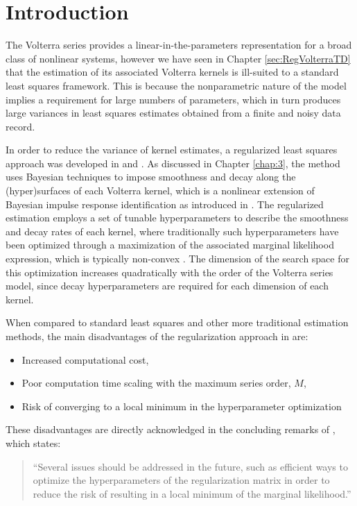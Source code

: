 \section{Introduction}

The Volterra series provides a linear-in-the-parameters representation for a broad class of nonlinear systems, however we have seen in Chapter \ref{sec:RegVolterraTD} that the estimation of its associated Volterra kernels is ill-suited to a standard least squares framework. This is because the nonparametric nature of the model implies a requirement for large numbers of parameters, which in turn produces large variances in least squares estimates obtained from a finite and noisy data record. 

In order to reduce the variance of kernel estimates, a regularized least squares approach was developed in \cite{Birpoutsoukis2017} and \cite{Birpoutsoukis2017c}. As discussed in Chapter \ref{chap:3}, the method uses Bayesian techniques to impose smoothness and decay along the (hyper)surfaces of each Volterra kernel, which is a nonlinear extension of Bayesian impulse response identification as introduced in \cite{Pillonetto2010}. The regularized estimation employs a set of tunable hyperparameters to describe the smoothness and decay rates of each kernel, where traditionally such hyperparameters have been optimized through a maximization of the associated marginal likelihood expression, which is typically non-convex \cite{Chen2013}. The dimension of the search space for this optimization increases quadratically with the order of the Volterra series model, since decay hyperparameters are required for each dimension of each kernel.

When compared to standard least squares and other more traditional estimation methods, the main disadvantages of the regularization approach in \cite{Birpoutsoukis2017} are:
\begin{itemize} 
\item Increased computational cost,
\item Poor computation time scaling with the maximum series order, $M$,
\item Risk of converging to a local minimum in the hyperparameter optimization 
\end{itemize}
These disadvantages are directly acknowledged in the concluding remarks of \cite{Birpoutsoukis2017}, which states:
\begin{quote}
``Several issues should be addressed in the future, such as efficient ways to optimize the hyperparameters of the regularization matrix in order to reduce the risk of resulting in a local minimum of the marginal likelihood.''
\end{quote} 

